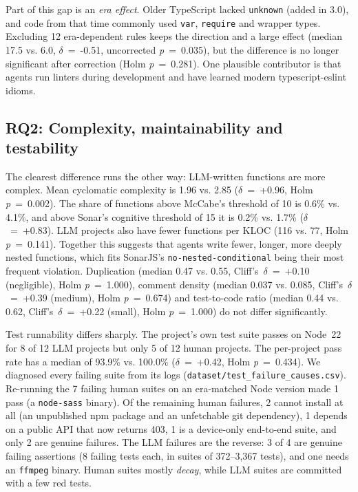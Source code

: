 \documentclass[10pt,conference]{IEEEtran}
\begin{document}
Part of this gap is an \emph{era effect}. Older TypeScript lacked \texttt{unknown} (added in 3.0), and code from that time commonly used \texttt{var}, \texttt{require} and wrapper types. Excluding 12 era-dependent rules keeps the direction and a large effect (median 17.5 vs. 6.0, $\delta$~=~-0.51, uncorrected \emph{p}~=~0.035), but the difference is no longer significant after correction (Holm \emph{p}~=~0.281). One plausible contributor is that agents run linters during development and have learned modern typescript-eslint idioms.

\subsection{RQ2: Complexity, maintainability and testability}
The clearest difference runs the other way: LLM-written functions are more complex. Mean cyclomatic complexity is 1.96 vs. 2.85 ($\delta$~=~+0.96, Holm \emph{p}~=~0.002). The share of functions above McCabe's threshold of 10 is 0.6\% vs. 4.1\%, and above Sonar's cognitive threshold of 15 it is 0.2\% vs. 1.7\% ($\delta$~=~+0.83). LLM projects also have fewer functions per KLOC (116 vs. 77, Holm \emph{p}~=~0.141). Together this suggests that agents write fewer, longer, more deeply nested functions, which fits SonarJS's \texttt{no-nested-conditional} being their most frequent violation. Duplication (median 0.47 vs. 0.55, Cliff's~$\delta$~=~+0.10 (negligible), Holm \emph{p}~=~1.000), comment density (median 0.037 vs. 0.085, Cliff's~$\delta$~=~+0.39 (medium), Holm \emph{p}~=~0.674) and test-to-code ratio (median 0.44 vs. 0.62, Cliff's~$\delta$~=~+0.22 (small), Holm \emph{p}~=~1.000) do not differ significantly.

Test runnability differs sharply. The project's own test suite passes on Node~22 for 8 of 12 LLM projects but only 5 of 12 human projects. The per-project pass rate has a median of 93.9\% vs. 100.0\% ($\delta$~=~+0.42, Holm \emph{p}~=~0.434). We diagnosed every failing suite from its logs (\texttt{dataset/test\_failure\_causes.csv}). Re-running the 7 failing human suites on an era-matched Node version made 1 pass (a \texttt{node-sass} binary). Of the remaining human failures, 2 cannot install at all (an unpublished npm package and an unfetchable git dependency), 1 depends on a public API that now returns 403, 1 is a device-only end-to-end suite, and only 2 are genuine failures. The LLM failures are the reverse: 3 of 4 are genuine failing assertions (8 failing tests each, in suites of 372--3,367 tests), and one needs an \texttt{ffmpeg} binary. Human suites mostly \emph{decay}, while LLM suites are committed with a few red tests.
\end{document}
